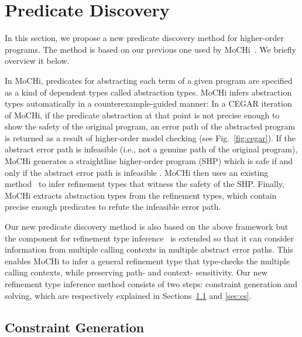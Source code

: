 

\section{Predicate Discovery}

In this section, we propose a new predicate discovery method for 
higher-order programs.  The method is based on our previous one used by 
MoCHi~\cite{KobayashiPLDI2011}.  We briefly overview it below.

In MoCHi, predicates for abstracting each term of a given program are 
specified as a kind of dependent types called abstraction types.  MoCHi 
infers abstraction types automatically in a counterexample-guided manner: 
 In a CEGAR iteration of MoCHi, if the predicate abstraction at that 
point is not precise enough to show the safety of the original program, 
an error path of the abstracted program is returned as a result of 
higher-order model checking (see Fig.~\ref{fig:cegar}).  If the abstract 
error path is infeasible (i.e., not a genuine path of the original 
program), MoCHi generates a straightline higher-order program (SHP) 
which is safe if and only if the abstract error path is infeasible .  
MoCHi then uses an existing method~\cite{Unno2009} to infer refinement 
types that witness the safety of the SHP.  Finally, MoCHi extracts 
abstraction types from the refinement types, which contain precise 
enough predicates to refute the infeasible error path.

Our new predicate discovery method is also based on the above framework 
but the component for refinement type inference~\cite{Unno2009} is 
extended so that it can consider information from multiple calling 
contexts in multiple abstract error paths.  This enables MoCHi to infer 
a general refinement type that type-checks the multiple calling contexts, 
while preserving path- and context- sensitivity.  Our new refinement 
type inference method consists of two steps: constraint generation and 
solving, which are respectively explained in Sections~\ref{sec:cg} and 
\ref{sec:cs}.

\subsection{Constraint Generation}
\label{sec:cg}

